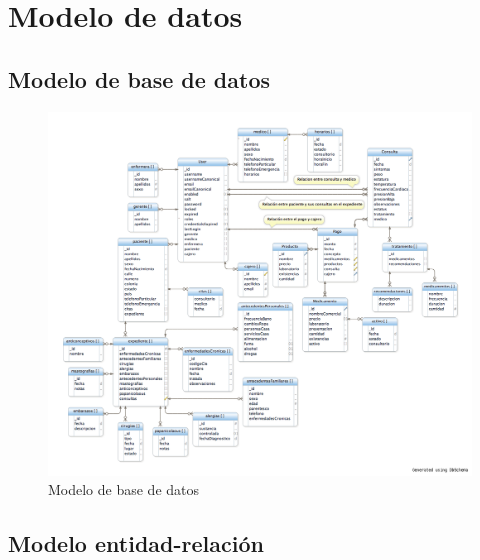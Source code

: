 \section{Modelo de datos}
	\subsection{Modelo de base de datos}
		\begin{figure}[htbp!]
			\centering
				\includegraphics[width=1\textwidth]{images/modeloDatos}
			\caption{Modelo de base de datos}
		\end{figure}
		\newpage
	\subsection{Modelo entidad-relación}
	\newpage
